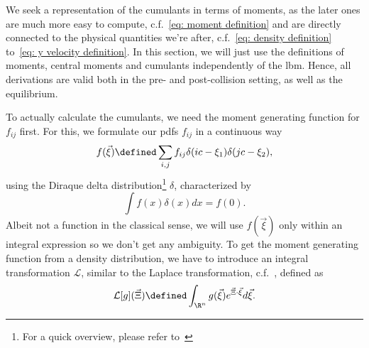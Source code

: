We seek a representation of the cumulants in terms of moments, as the later ones are much more easy to compute, c.f.~\eqref{eq: moment definition} and are directly connected to the physical quantities we're after, c.f.~\eqref{eq: density definition} to~\eqref{eq: y velocity definition}.
In this section, we will just use the definitions of moments, central moments and cumulants independently of the \gls{lbm}.
Hence, all derivations are valid both in the pre- and post-collision setting, as well as the equilibrium.

To actually calculate the cumulants, we need the moment generating function for $f_{ij}$ first.
For this, we formulate our \glspl{pdf} $f_{ij}$ in a continuous way
\begin{equation}
  \label{eq:Definition of f xi}
  f(\vec{\xi}) \defined \sum_{i,j} f_{ij}\delta(ic - \xi_1)\delta(jc - \xi_2),
\end{equation}
using the Diraque delta distribution\footnote{For a quick overview, please refer to~\cite{weissteinDelta}} $\delta$, characterized by
\begin{equation}
  \label{eq: diraque feature}
  \int f(x)\delta(x)dx = f(0).
\end{equation}
Albeit not a function in the classical sense, we will use $f(\vec{\xi})$ only within an integral expression so we don't get any ambiguity.
To get the moment generating function from a density distribution, we have to introduce an integral transformation $\mathcal{L}$, similar to the Laplace transformation, c.f.~\cite{weissteinLaplace}, defined as
\begin{equation}
  \label{eq: Definition of integral transformation}
  \mathcal{L}[g](\vec{\Xi}) \defined \int_{\R^n} g(\vec{\xi}) e^{\vec{\Xi} \cdot \vec{\xi}}d\vec{\xi}.
\end{equation}

